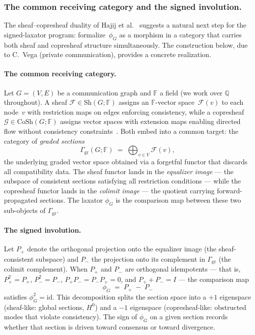 \subsubsection{The common receiving category and the signed involution.}
\label{sec:copresheaf-future}

The sheaf--copresheaf duality of Hajij et
al.~\cite{hajij2025copresheaf} suggests a natural next step for the
signed-laxator program: formalize~$\phi_G$ as a morphism in a
category that carries both sheaf and copresheaf structure
simultaneously.  The construction below, due to C.~Vega (private
communication), provides a concrete realization.

\paragraph{The common receiving category.}
Let $G = (V,E)$ be a communication graph and $\mathbb{F}$ a field
(we work over $\mathbb{Q}$ throughout).  A sheaf
$\mathcal{F} \in \mathrm{Sh}(G;\mathbb{F})$ assigns an
$\mathbb{F}$-vector space~$\mathcal{F}(v)$ to each node~$v$ with
restriction maps on edges enforcing consistency, while a copresheaf
$\mathcal{G} \in \mathrm{CoSh}(G;\mathbb{F})$ assigns vector spaces
with extension maps enabling directed flow without consistency
constraints~\cite{hajij2025copresheaf}.  Both embed into a common
target: the category of \emph{graded sections}
\[
  \Gamma_{\mathrm{gr}}(G;\mathbb{F})
  \;=\;
  \bigoplus_{v \in V} \mathcal{F}(v),
\]
the underlying graded vector space obtained via a forgetful functor
that discards all compatibility data.  The sheaf functor lands in the
\emph{equalizer image} --- the subspace of consistent sections
satisfying all restriction conditions --- while the copresheaf functor
lands in the \emph{colimit image} --- the quotient carrying
forward-propagated sections.  The laxator $\phi_G$ is the comparison
map between these two sub-objects of $\Gamma_{\mathrm{gr}}$.

\paragraph{The signed involution.}
Let $P_+$ denote the orthogonal projection onto the equalizer image
(the sheaf-consistent subspace) and $P_-$ the projection onto its
complement in $\Gamma_{\mathrm{gr}}$ (the colimit complement).  When
$P_+$ and $P_-$ are orthogonal idempotents --- that is,
$P_+^2 = P_+$, $P_-^2 = P_-$, $P_+ P_- = P_- P_+ = 0$, and
$P_+ + P_- = I$ --- the comparison map
\begin{equation}
\label{eq:phi-involution}
  \phi_G \;=\; P_+ \;-\; P_-
\end{equation}
satisfies $\phi_G^2 = \mathrm{id}$.  This decomposition splits the
section space into a $+1$ eigenspace (sheaf-like: global sections,
$H^0$) and a $-1$ eigenspace (copresheaf-like: obstructed modes
that violate consistency).  The sign of $\phi_G$ on a given section
records whether that section is driven toward consensus or toward
divergence.

